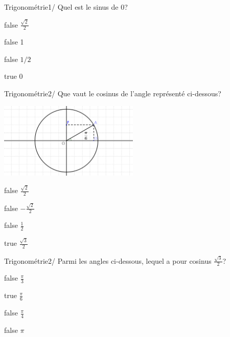         	\begin{question}{31}{Trigonométrie}{1}{/}
				Quel est le sinus de $0$?
            \end{question}
            \begin{reponses}
            	\item[false] $\frac{\sqrt{2}}{2}$
            	\item[false] 1
                \item[false] $1/2$
                \item[true] 0
            \end{reponses}
            \begin{question}{31}{Trigonométrie}{2}{/}
                Que vaut le cosinus de l'angle représenté ci-dessous?
                \begin{center}
                	\includegraphics[width=0.5\textwidth]{Philippe/Figures_Philippe/trigo_1_3.png}
                \end{center}
            \end{question}
            \begin{reponses}
                \item[false] $\frac{\sqrt{2}}{2}$
                \item[false] $-\frac{\sqrt{2}}{2}$
                \item[false] $\frac{1}{2}$
                \item[true] $\frac{\sqrt{3}}{2}$
            \end{reponses}
            \begin{question}{31}{Trigonométrie}{2}{/}
				Parmi les angles ci-dessous, lequel a pour cosinus $\frac{\sqrt{3}}{2}$?
            \end{question}
            \begin{reponses}
            	\item[false] $\frac{\pi}{3}$
            	\item[true] $\frac{\pi}{6}$
                \item[false] $\frac{\pi}{4}$
                \item[false] $\pi$
            \end{reponses}
